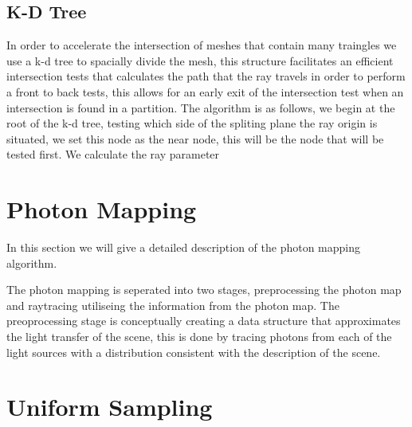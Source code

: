 \subsection{K-D Tree}
In order to accelerate the intersection of meshes that contain many traingles we use a k-d tree to spacially divide the mesh,
this structure facilitates an efficient intersection tests that calculates the path that the ray travels in order to perform
a front to back tests, this allows for an early exit of the intersection test when an intersection is found in a partition.
The algorithm is as follows, we begin at the root of the k-d tree, testing which side of the spliting plane the ray origin
is situated, we set this node as the near node, this will be the node that will be tested first. We calculate the ray parameter


\section{Photon Mapping}
In this section we will give a detailed description of the photon mapping algorithm.

The photon mapping is seperated into two stages, preprocessing the photon map and raytracing utiliseing the information from the photon
map. The preoprocessing stage is conceptually creating a data structure that approximates the light transfer of the scene, this is done
by tracing photons from each of the light sources with a distribution consistent with the description of the scene.

\section{Uniform Sampling}
